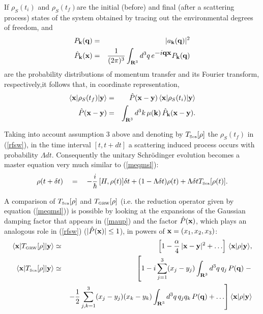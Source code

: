 \documentclass[12pt]{article}
\begin{document}
If $\rho_{S}(t_{i})$ and $\rho_{S}(t_{f})$are the initial (before)
and final (after a scattering process) states of the system
obtained by tracing out the environmental  degrees of freedom, and
\begin{eqnarray} \label{pgiu}
P_{\bf k}({\bf q}) & = & |a_{\bf k}({\bf q})|^{2} \\
\hat{P}_{\bf k}({\bf x}) & = & \frac{1}{(2\pi)^{3}} \int_{{\bf
R}^{3}} d^{3}q\, e^{\displaystyle -i {\bf q x}} P_{\bf k}({\bf q})
\end{eqnarray}
are the probability distributions of momentum transfer and its Fourier
transform,
respectively,it follows that, in coordinate representation,
\begin{eqnarray} \label{rfsw}
\langle {\bf x}| \rho_{S}(t_{f}) | {\bf y} \rangle & = &
\hat{P}({\bf x} - {\bf y})\,
\langle {\bf x}| \rho_{S}(t_{i}) | {\bf y} \rangle \\
\hat{P}({\bf x} - {\bf y}) & = & \int_{{\bf R}^{3}} d^{3}k\,
\mu({\bf k})\, \hat{P}_{\bf k}({\bf x} - {\bf y}).
\end{eqnarray}

Taking into account  assumption 3 above and denoting by
$T_{\makebox{\tiny Sca}}[\rho]$ the $\rho_{S}(t_{f})$ in
(\ref{rfsw}), in the time interval $[t, t + dt]$ a scattering
induced process occurs with probability $\Lambda dt$. Consequently
the unitary Schr\"odinger evolution becomes a master equation
very much similar to (\ref{meqmsl}):
\begin{equation} \label{ftjn}
\rho(t + \delta t) \quad = \quad -\frac{i}{\hbar}\, [H, \rho(t)]
\delta t + (1 - \Lambda \delta t) \rho(t) + \Lambda \delta t
T_{\makebox{\tiny Sca}}[\rho(t)].
\end{equation}

A comparison of $T_{\makebox{\tiny Sca}}[\rho]$ and
$T_{\makebox{\tiny GRW}}[\rho]$ (i.e. the reduction operator given
by equation (\ref{meqmsl})) is possible by looking at the
expansions of the Gaussian damping factor that appears in
(\ref{maup}) and the factor $\hat{P}({\bf x})$, which plays an
analogous role in (\ref{rfsw}) ($|\hat{P}({\bf x})| \leq 1$), in
powers of ${\bf x} = (x_{1}, x_{2}, x_{3})$:
\begin{eqnarray}
\langle {\bf x}|T_{\makebox{\tiny GRW}}[\rho]|{\bf y} \rangle &
\simeq & \left[1 - \frac{\alpha}{4}\, |{\bf x} - {\bf y}|^{2} +
\ldots
\right]\, \langle {\bf x}|\rho|{\bf y} \rangle, \\
\langle {\bf x}|T_{\makebox{\tiny Sca}}[\rho]|{\bf y} \rangle &
\simeq & \left[1 - i\sum_{j=1}^{3}(x_{j} - y_{j}) \int_{{\bf
R}^{3}}
d^{3}q\, q_{j}\, P({\bf q}) \; - \right. \label{mmqe} \\
& & \left. -\frac{1}{2}\sum_{j,k=1}^{3}(x_{j} - y_{j})(x_{k} -
y_{k}) \int_{{\bf R}^{3}} d^{3}q\, q_{j}q_{k}\, P({\bf q}) +
\ldots \right] \langle {\bf x}|\rho|{\bf y} \rangle \nonumber
\end{eqnarray}
\end{document}
